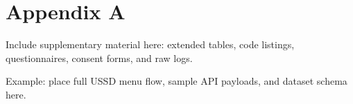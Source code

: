 \chapter{Appendix A}
\label{apx:A}

Include supplementary material here: extended tables, code listings, questionnaires, consent forms, and raw logs.

Example: place full USSD menu flow, sample API payloads, and dataset schema here.
